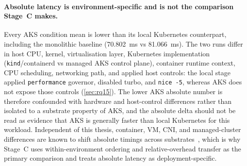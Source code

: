 \paragraph{Absolute latency is environment-specific and is not the comparison Stage~C makes.}
Every AKS condition mean is lower than its local Kubernetes counterpart,
including the monolithic baseline (70.802~ms vs 81.066~ms). The two
runs differ in host CPU, kernel, virtualisation layer, Kubernetes
implementation (\texttt{kind}/containerd vs managed AKS control plane),
container runtime context, CPU scheduling, networking path, and applied
host controls: the local stage applied \texttt{performance} governor,
disabled turbo, and \texttt{nice~-5}, whereas AKS does not expose those
controls (\cref{sec:rq15}). The lower AKS absolute number is therefore
confounded with hardware and host-control differences rather than
isolated to a substrate property of AKS, and the absolute delta should
not be read as evidence that AKS is generally faster than local
Kubernetes for this workload. Independent of this thesis, container,
VM, CNI, and managed-cluster differences are known to shift absolute
timings across substrates~\cite{virtualization_costs,cni_k8s_ic2e21,
noise_in_clouds,managed_k8s_perf}, which is why Stage~C uses
within-environment ordering and relative-overhead transfer as the primary
comparison and treats absolute latency as deployment-specific.

